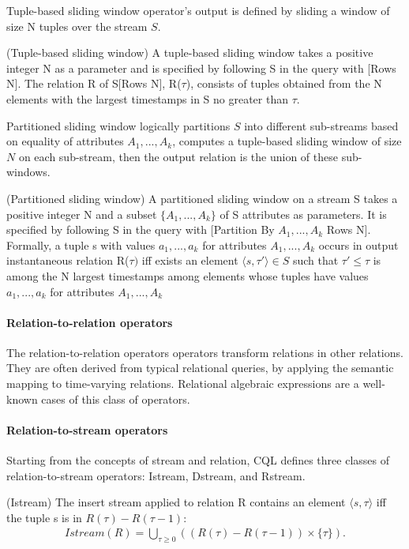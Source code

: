 Tuple-based sliding window operator's output is defined by sliding a window of size N tuples over the stream $S$.
\begin{Definition}
(Tuple-based sliding window) A tuple-based sliding window takes a positive integer N as a parameter and is specified by following S in the query with [Rows N].
The relation R of S[Rows N], R($\tau$), consists of tuples obtained from the N elements with the largest timestamps in S no greater than $\tau$.
\end{Definition}

Partitioned sliding window logically partitions $S$ into different sub-streams based on equality of attributes $A_1, ..., A_k$, computes a tuple-based sliding window of size $N$ on each sub-stream, then the output relation is the union of these sub-windows.
\begin{Definition}
(Partitioned sliding window) A partitioned sliding window on a stream S takes a positive integer N and a subset $\{A_1, ..., A_k\}$ of S attributes as parameters. It is specified by following S in the query with [Partition By $A_1, ..., A_k$ Rows N].
Formally, a tuple s with values $a_1, ..., a_k$ for attributes $A_1, ..., A_k$ occurs in output instantaneous relation R($\tau)$ iff exists an element $\langle s,\tau' \rangle \in S$ such that $\tau' \leq \tau$ is among the N largest timestamps among elements whose tuples have values $a_1, ..., a_k$ for attributes $A_1, ..., A_k$
\end{Definition}

\paragraph{Relation-to-relation operators}
The relation-to-relation operators operators transform relations in other relations. 
They are often derived from typical relational queries, by applying the semantic mapping to time-varying relations.
Relational algebraic expressions are a well-known cases of this class of operators.

\paragraph{Relation-to-stream operators}
Starting from the concepts of stream and relation, CQL defines three classes of relation-to-stream operators: Istream, Dstream, and Rstream. 

\begin{Definition}
(Istream) The insert stream applied to relation R contains an element $\langle s,\tau \rangle$ iff the tuple s is in $R(\tau) - R(\tau - 1)$: 
\noindent\begin{align*}
Istream(R) = \bigcup_{\tau \geq 0} ((R(\tau) - R(\tau - 1)) \times \{\tau\}).
\end{align*} 
\end{Definition}

